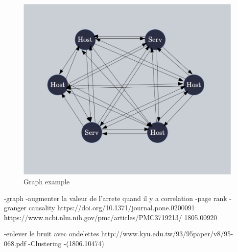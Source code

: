 \documentclass[10pt,a4paper,oneside]{article}
\begin{document}
\begin{figure}[!h]
\centering
\includegraphics[scale=0.45]{./images/graphe.png}
\caption{Graph example}
\label{graph}
\end{figure}

\vspace{0.8cm}

\begin{multicols}{2}


-graph
-augmenter la valeur de l'arrete quand il y a correlation
-page rank
-granger causality
https://doi.org/10.1371/journal.pone.0200091
https://www.ncbi.nlm.nih.gov/pmc/articles/PMC3719213/
1805.00920


\end{multicols}
-enlever le bruit avec ondelettes 
http://www.kyu.edu.tw/93/95paper/v8/95-068.pdf
-Clustering
-(1806.10474)
\end{document}
